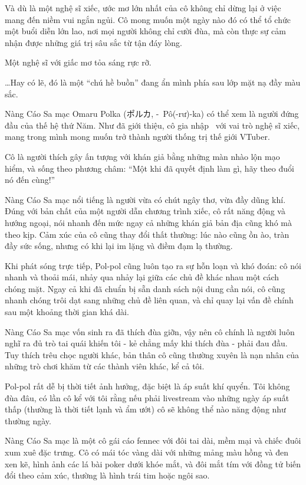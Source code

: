 \documentclass[../main.tex]{subfiles}
\begin{document}
Và dù là một nghệ sĩ xiếc, ước mơ lớn nhất của cô không chỉ dừng lại ở việc mang đến niềm vui ngắn ngủi. Cô mong muốn một ngày nào đó có thể tổ chức một buổi diễn lớn lao, nơi mọi người không chỉ cười đùa, mà còn thực sự cảm nhận được những giá trị sâu sắc từ tận đáy lòng.


Một nghệ sĩ với giấc mơ tỏa sáng rực rỡ.

\dots Hay có lẽ, đó là một ``chú hề buồn'' đang ẩn mình phía sau lớp mặt nạ đầy màu sắc.

\chrint

Nàng Cáo Sa mạc Omaru Polka (ポルカ, -\ Pô(-rư)-ka) có thể xem là người đứng đầu của thế hệ thứ Năm. Như đã giới thiệu, cô gia nhập \hll\ với vai trò nghệ sĩ xiếc, mang trong mình mong muốn trở thành người thống trị thế giới VTuber.

Cô là người thích gây ấn tượng với khán giả bằng những màn nhào lộn mạo hiểm, và sống theo phương châm: ``Một khi đã quyết định làm gì, hãy theo đuổi nó đến cùng!''

Nàng Cáo Sa mạc nổi tiếng là người vừa có chút ngây thơ, vừa đầy dũng khí. Đúng với bản chất của một người dẫn chương trình xiếc, cô rất năng động và hướng ngoại, nói nhanh đến mức ngay cả những khán giả bản địa cũng khó mà theo kịp. Cảm xúc của cô cũng thay đổi thất thường: lúc nào cũng ồn ào, tràn đầy sức sống, nhưng có khi lại im lặng và điềm đạm lạ thường.

Khi phát sóng trực tiếp, Pol-pol cũng luôn tạo ra sự hỗn loạn và khó đoán: cô nói nhanh và thoải mái, nhảy qua nhảy lại giữa các chủ đề khác nhau một cách chóng mặt. Ngay cả khi đã chuẩn bị sẵn danh sách nội dung cần nói, cô cũng nhanh chóng trôi dạt sang những chủ đề liên quan, và chỉ quay lại vấn đề chính sau một khoảng thời gian khá dài.

Nàng Cáo Sa mạc vốn sinh ra đã thích đùa giỡn, vậy nên cô chính là người luôn nghĩ ra đủ trò tai quái khiến tôi - kẻ chẳng mấy khi thích đùa - phải đau đầu. Tuy thích trêu chọc người khác, bản thân cô cũng thường xuyên là nạn nhân của những trò chơi khăm từ các thành viên khác, kể cả tôi.

Pol-pol rất dễ bị thời tiết ảnh hưởng, đặc biệt là áp suất khí quyển. Tôi không đùa đâu, có lần cô kể với tôi rằng nếu phải livestream vào những ngày áp suất thấp (thường là thời tiết lạnh và ẩm ướt) cô sẽ không thể nào năng động như thường ngày.

Nàng Cáo Sa mạc là một cô gái cáo fennec với đôi tai dài, mềm mại và chiếc đuôi xum xuê đặc trưng. Cô có mái tóc vàng dài với những mảng màu hồng và đen xen kẽ, hình ảnh các lá bài poker dưới khóe mắt, và đôi mắt tím với đồng tử biến đổi theo cảm xúc, thường là hình trái tim hoặc ngôi sao.
\end{document}
